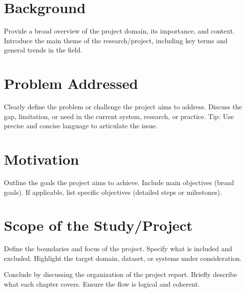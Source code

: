 \section{Background}

Provide a broad overview of the project domain, its importance, and context.
Introduce the main theme of the research/project, including key terms and general trends in the field.

\section{Problem Addressed}

Clearly define the problem or challenge the project aims to address.
 Discuss the gap, limitation, or need in the current system, research, or practice.
Tip: Use precise and concise language to articulate the issue.

\section{Motivation}
Outline the goals the project aims to achieve.
Include main objectives (broad goals).
If applicable, list specific objectives (detailed steps or milestones).

\section{Scope of the Study/Project}   
 Define the boundaries and focus of the project.
Specify what is included and excluded.
Highlight the target domain, dataset, or systems under consideration.

Conclude by discussing the organization of the project report. Briefly describe what each chapter covers.
Ensure the flow is logical and coherent.

